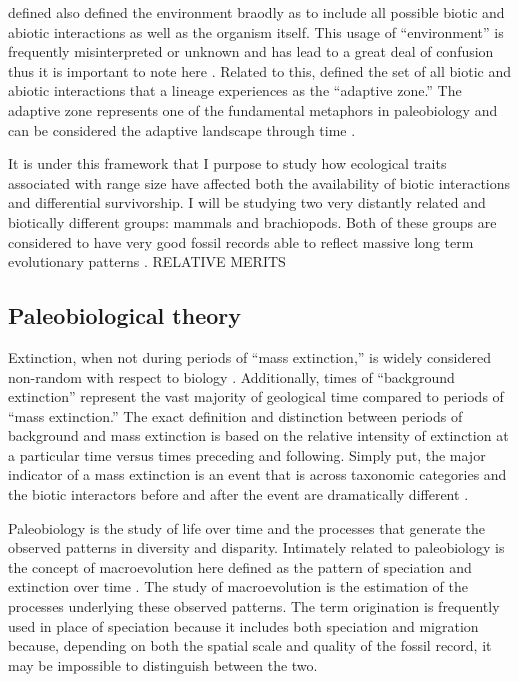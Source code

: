 \documentclass[12pt,letterpaper]{article}
\begin{document}
\citet{Simpson1944} defined also defined the environment braodly as to include all possible biotic and abiotic interactions as well as the organism itself. This usage of ``environment'' is frequently misinterpreted or unknown and has lead to a great deal of confusion thus it is important to note here \citep{VanValen1973,Barnosky2001a,Liow2011a}. Related to this, \citet{Simpson1944} defined the set of all biotic and abiotic interactions that a lineage experiences as the ``adaptive zone.'' The adaptive zone represents one of the fundamental metaphors in paleobiology and can be considered the adaptive landscape through time \citep{Simpson1944,Simpson1953}. 

It is under this framework that I purpose to study how ecological traits associated with range size have affected both the availability of biotic interactions and differential survivorship. I will be studying two very distantly related and biotically different groups: mammals and brachiopods. Both of these groups are considered to have very good fossil records able to reflect massive long term evolutionary patterns \citep{Mark1977}. RELATIVE MERITS



\subsection{Paleobiological theory}
Extinction, when not during periods of ``mass extinction,'' is widely considered non-random with respect to biology \citep{Jablonski1986}. Additionally, times of ``background extinction'' represent the vast majority of geological time compared to periods of ``mass extinction.'' The exact definition and distinction between periods of background and mass extinction is based on the relative intensity of extinction at a particular time versus times preceding and following. Simply put, the major indicator of a mass extinction is an event that is across taxonomic categories and the biotic interactors before and after the event are dramatically different \citep{Jablonski1986,Jablonski2005,Kitchell1986,Kitchell1991}.

Paleobiology is the study of life over time and the processes that generate the observed patterns in diversity and disparity. Intimately related to paleobiology is the concept of macroevolution here defined as the pattern of speciation and extinction over time \citep{Jablonski2008a}. The study of macroevolution is the estimation of the processes underlying these observed patterns. The term origination is frequently used in place of speciation because it includes both speciation and migration because, depending on both the spatial scale and quality of the fossil record, it may be impossible to distinguish between the two.
\end{document}
